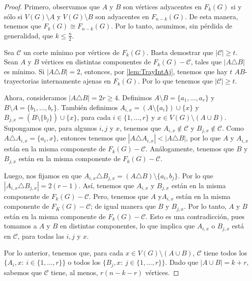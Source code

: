 \begin{proof}
Primero, observamos que $A$ y $B$ son v\'ertices adyacentes en $F_k(G)$ si y
s\'olo si $V(G) \setminus A$ y $V(G)\setminus B$ son adyacentes en $F_{n-k}(G)$.
De esta manera, tenemos que $F_k(G) \cong F_{n-k}(G)$. Por lo tanto, asumimos,
sin p\'erdida de generalidad, que $k \leq \frac{n}{2}$.

Sea $\mathcal{C}$ un corte m\'inimo por v\'ertices de $F_k(G)$. Basta demostrar
que $|\mathcal{C}| \geq t$. Sean $A$ y $B$ v\'ertices en distintas componentes
de $F_k(G)- \mathcal{C}$, tales que $|A \triangle B|$ es m\'inimo. Si $|A
\triangle B| = 2$, entonces, por \cref{lem:TrayIntAj}, tenemos que hay $t$
$AB$-trayectorias internamente ajenas en $F_k(G)$. Por lo que tenemos que
$|\mathcal{C}| \geq t$.

Ahora, consideramos $|A \triangle B| = 2r \geq 4$. Definimos $A \setminus B
=\{a_1, \dots, a_r\}$ y $B \setminus A =\{b_1, \dots, b_r\}$. Tambi\'en
definimos $A_{i,x} = (A\setminus \{a_i\}) \cup \{x\}$ y $B_{j,x} = (B\setminus
\{b_j\}) \cup \{x\}$, para cada $i \in \{1, \dots, r\}$ y $x \in V(G)\setminus
(A\cup B)$. Supongamos que, para algunos $i, j$ y $x$, tenemos que $A_{i,x}
\notin \mathcal{C}$ y $B_{j,x} \notin \mathcal{C}$. Como $A \triangle A_{i,x} =
\{a_i, x\}$, entonces tenemos que $|A \triangle A_{i,x}|< |A \triangle B|$, por
lo que $A$ y $A_{i,x}$ est\'an en la misma componente de $F_k(G)- \mathcal{C}$.
An\'alogamente, tenemos que  $B$ y $B_{j,x}$ est\'an en la misma componente de
$F_k(G)-\mathcal{C}$.

Luego, nos fijamos en que $A_{i,x} \triangle B_{j,x} = (A \triangle B) \setminus
\{a_i, b_j\}$. Por lo que $|A_{i,x} \triangle B_{j,x}| = 2(r-1)$. As\'i, tenemos
que $A_{i,x}$ y $B_{j,x}$ est\'an en la misma componente de $F_k(G)-
\mathcal{C}$. Pero, tenemos que $A$ y$A_{i,x}$ est\'an en la misma componente de
$F_K(G) - \mathcal{C}$; de igual manera que $B$ y $B_{j,x}$. Por lo tanto, $A$ y
$B$ est\'an en la misma componente de $F_k(G)- \mathcal{C}$. Esto es una
contradicci\'on, pues tomamos a $A$ y $B$ en distintas componentes, lo que
implica que $A_{i,x}$ o $B_{j,x}$ est\'a en $\mathcal{C}$, para todas las $i,j$
y $x$.

Por lo anterior, tenemos que, para cada $x \in V(G)\setminus (A \cup B)$,
$\mathcal{C}$ tiene todos los $\{A_i,x \colon\  i \in \{1, \dots, r\}\}$ o todos
los $\{B_j,x \colon\ j \in \{1, \dots, r\}\}$. Dado que $|A\cup B|=k +r$,
sabemos que $\mathcal{C}$ tiene, al menos, $r(n-k-r)$ v\'ertices.


\end{proof}
